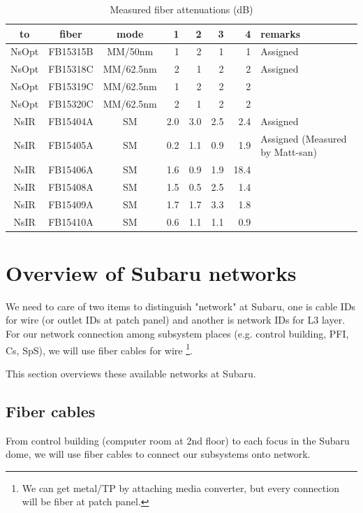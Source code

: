 \documentclass[a4paper,notitlepage]{article}
\begin{document}
\begin{table}[htb]
\begin{center}
\caption{Measured fiber attenuations (dB)}
\label{tab:subaru-measurement}
\begin{tabular}{c|c|c||r|r|r|r||l}
to & fiber & mode & 1 & 2 & 3 & 4 & remarks \\
\hline
NsOpt & FB15315B & MM/50nm & 1 & 2 & 1 & 1 & Assigned \\
NsOpt & FB15318C & MM/62.5nm & 2 & 1 & 2 & 2 & Assigned \\
NsOpt & FB15319C & MM/62.5nm & 1 & 2 & 2 & 2 & \\
NsOpt & FB15320C & MM/62.5nm & 2 & 1 & 2 & 2 & \\
NsIR & FB15404A & SM & 2.0 & 3.0 & 2.5 & 2.4 & Assigned \\
NsIR & FB15405A & SM & 0.2 & 1.1 & 0.9 & 1.9 & Assigned (Measured by Matt-san) \\
NsIR & FB15406A & SM & 1.6 & 0.9 & 1.9 & 18.4 & \\
NsIR & FB15408A & SM & 1.5 & 0.5 & 2.5 & 1.4 &  \\
NsIR & FB15409A & SM & 1.7 & 1.7 & 3.3 & 1.8 &  \\
NsIR & FB15410A & SM & 0.6 & 1.1 & 1.1 & 0.9 &  \\
\end{tabular}
\end{center}
\end{table}

\appendix

\section{Overview of Subaru networks}

We need to care of two items to distinguish "network" at Subaru, one is 
cable IDs for wire (or outlet IDs at patch panel) 
and another is network IDs for L3 layer. 
For our network connection among subsystem places (e.g. control building, 
PFI, Cs, SpS), we will use fiber cables for wire
\footnote{We can get metal/TP by attaching media converter, but every 
connection will be fiber at patch panel.}. 

This section overviews these available networks at Subaru. 

\subsection{Fiber cables}

From control building (computer room at 2nd floor) to each focus in the 
Subaru dome, we will use fiber cables to connect our subsystems onto network. 
\end{document}
